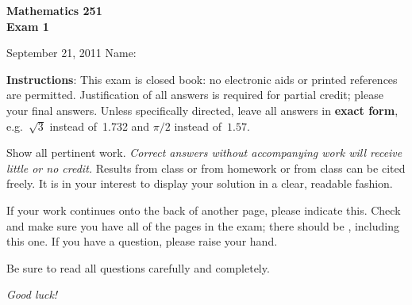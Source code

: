 \documentclass[11pt]{exam}
\begin{document}
\addpoints

\noindent
\textbf{{\large Mathematics 251 \\ Exam 1}}

\noindent
September 21, 2011  \hfill Name: \underline{\hspace{3in}}


\noindent
\textbf{Instructions}: This exam is closed book: no electronic aids or
printed references are permitted. Justification of all answers is required
for partial credit; please  your final answers. Unless
specifically directed, leave all answers in \textbf{exact form}, e.g.\
$\sqrt{3}$ instead of~1.732 and $\pi/2$ instead of~$1.57$.

Show all pertinent work. \emph{Correct answers without accompanying work will receive little or no credit.} Results from class or from homework or from class can be cited freely. It is in your interest to display your solution in a
clear, readable fashion.

If your work continues onto the back of another page, please indicate
this. Check and make sure you have all of the pages in the
exam; there should be \numpages, including this one. If you have a
question, please raise your hand.

Be sure to read all questions carefully and completely.

\vspace*{2in}

\begin{center}
\gradetable
\end{center}

\vspace*{0.5in}

\begin{center}
{\Large \emph{Good luck!}}
\end{center}

\newpage
\end{document}
